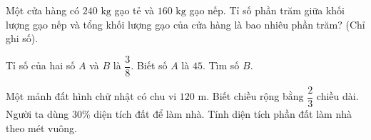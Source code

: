 \begin{ex} %
Một cửa hàng có $240\text{ kg}$ gạo tẻ và $160\text{ kg}$ gạo nếp. Tỉ số phần trăm giữa khối lượng gạo nếp và tổng khối lượng gạo của cửa hàng là bao nhiêu phần trăm? (Chỉ ghi số).
\end{ex}

\begin{ex} %
Tỉ số của hai số $A$ và $B$ là $\dfrac{3}{8}$. Biết số $A$ là $45$. Tìm số $B$.
\end{ex}

\begin{ex} %
Một mảnh đất hình chữ nhật có chu vi $120\text{ m}$. Biết chiều rộng bằng $\dfrac{2}{3}$ chiều dài. Người ta dùng $30\%$ diện tích đất để làm nhà. Tính diện tích phần đất làm nhà theo mét vuông.
\end{ex}
